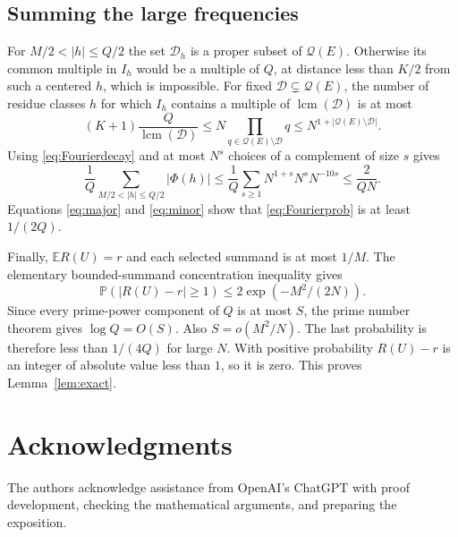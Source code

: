 \documentclass[11pt,leqno]{amsart}
\numberwithin{equation}{section}
\theoremstyle{definition}
\theoremstyle{remark}
\newcommand{\lcm}{\operatorname{lcm}}
\newcommand{\pp}{\mathcal Q}
\newcommand{\card}[1]{\lvert #1\rvert}
\begin{document}
\subsection{Summing the large frequencies}

For $M/2<|h|\le Q/2$ the set $\mathcal D_h$ is a proper subset of
$\pp(E)$. Otherwise its common multiple in $I_h$ would be a multiple
of $Q$, at distance less than $K/2$ from such a centered $h$, which is
impossible.
For fixed $\mathcal D\subsetneq\pp(E)$, the number of residue classes
$h$ for which $I_h$ contains a multiple of $\lcm(\mathcal D)$ is at most
\[
 (K+1)\frac Q{\lcm(\mathcal D)}
 \le N\prod_{q\in\pp(E)\setminus\mathcal D}q
 \le N^{1+\card{\pp(E)\setminus\mathcal D}}.
\]
Using \eqref{eq:Fourierdecay} and at most $N^s$ choices of a complement
of size $s$ gives
\begin{equation}\label{eq:minor}
 \frac1Q\sum_{M/2<|h|\le Q/2}|\Phi(h)|
 \le\frac1Q\sum_{s\ge1}N^{1+s}N^sN^{-10s}
 \le\frac2{QN}.
\end{equation}
Equations \eqref{eq:major} and \eqref{eq:minor} show that
\eqref{eq:Fourierprob} is at least $1/(2Q)$.

Finally, $\mathbb E R(U)=r$ and each selected summand is at most $1/M$.
The elementary bounded-summand concentration inequality gives
\[
 \mathbb P(|R(U)-r|\ge1)\le2\exp(-M^2/(2N)).
\]
Since every prime-power component of $Q$ is at most $S$, the prime
number theorem gives $\log Q=O(S)$. Also $S=o(M^2/N)$.
The last probability is therefore less than $1/(4Q)$ for large $N$.
With positive probability $R(U)-r$ is an integer of absolute value less
than $1$, so it is zero. This proves Lemma~\ref{lem:exact}.

\section*{Acknowledgments}
The authors acknowledge assistance from OpenAI's ChatGPT with proof
development, checking the mathematical arguments, and preparing the
exposition.
\end{document}
